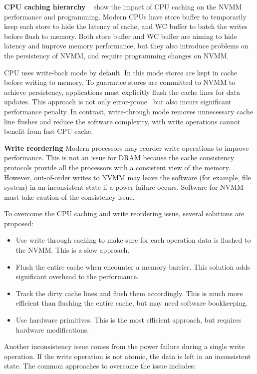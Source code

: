 \textbf{CPU caching hierarchy}
~\cite{CPUcaching} show the impact of CPU caching on the NVMM performance
and programming. Modern CPUs have store buffer to temporarily keep each store
to hide the latency of cache, and WC buffer to batch the writes before
flush to memory. Both store buffer and WC buffer are aiming to hide latency
and improve memory performance, but they also introduce problems on the
persistency of NVMM, and require programming changes on NVMM.

CPU uses write-back mode by default. In this mode stores are kept in cache
before writing to memory. To guarantee stores are committed to NVMM to achieve
persistency, applications must explicitly flush the cache lines for data
updates. This approach is not only error-prone~\cite{singlelock}
but also incurs significant
performance penalty. In contrast, write-through mode removes unnecessary
cache line flushes and reduce the software complexity, with write operations
cannot benefit from fast CPU cache.

\textbf{Write reordering} Modern processors may reorder write operations to improve
performance. This is not an issue for DRAM because the cache consistency
protocols provide all the processors with a consistent view of the memory.
However, out-of-order writes to NVMM may leave the software (for example,
file system) in an inconsistent state if a power failure occurs. Software
for NVMM must take caution of the consistency issue. 

To overcome the CPU caching and write reordering issue,
several solutions are proposed:

\begin{itemize}
\item Use write-through caching to make sure for each operation
data is flushed to the NVMM. This is a slow approach. 
\item Flush the entire cache when encounter a memory barrier. This solution
adds significant overhead to the performance.
\item Track the dirty cache lines and flush them accordingly. This is much
more efficient than flushing the entire cache, but may need software bookkeeping.
\item Use hardware primitives. This is the most efficient approach, but requires
hardware modifications.
\end{itemize}

Another inconsistency issue comes from the power failure during a single
write operation. If the write operation is not atomic, the data is left
in an inconsistent state. The common approaches to overcome the issue includes:

